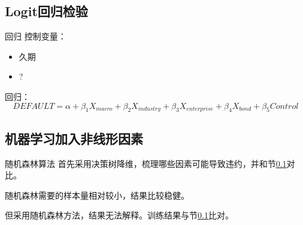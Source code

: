 \subsection{Logit回归检验}
\label{Logit}
\begin{frame}{回归}
	控制变量：
	\begin{itemize}
		\item 久期
		\item ?
	\end{itemize}
	回归：
	\begin{equation*}
		DEFAULT = \alpha + \beta_1 X_{macro} + \beta_2 X_{industry} + \beta_3 X_{enterprise} + \beta_4 X_{bond} + \beta_5 Control
	\end{equation*}

\end{frame}
\subsection{机器学习加入非线形因素}
\begin{frame}{随机森林算法}
	首先采用决策树降维，梳理哪些因素可能导致违约，并和节\ref{Logit}对比。

	随机森林需要的样本量相对较小，结果比较稳健。

	但采用随机森林方法，结果无法解释。训练结果与节\ref{Logit}比对。
\end{frame}
